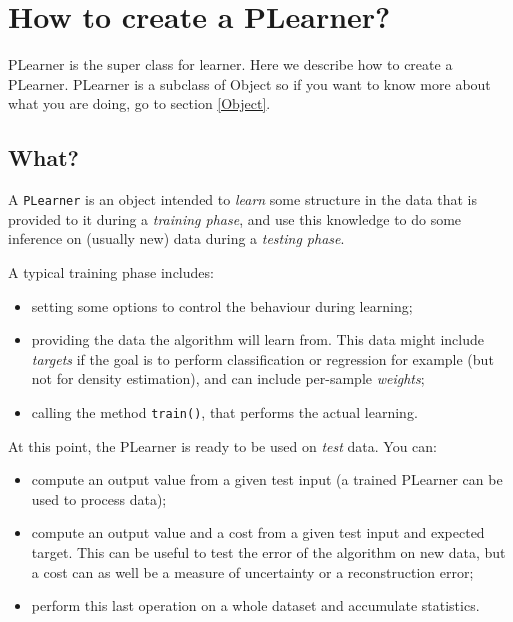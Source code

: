 \documentclass[11pt]{book}
\begin{document}
\section{How to create a PLearner?}

PLearner is the super class for learner. Here we describe how to create
a PLearner. PLearner is a subclass of Object so if you want to know more
about what you are doing, go to section \ref{Object}.

\subsection{What?}

A {\tt PLearner} is an object intended to {\em learn} some structure in
the data that is provided to it during a {\em training phase}, and use
this knowledge to do some inference on (usually new) data during a {\em
testing phase}.

A typical training phase includes:
\begin{itemize}
  \item setting some options to control the behaviour during learning;

  \item providing the data the algorithm will learn from. This data
  might include {\em targets} if the goal is to perform classification
  or regression for example (but not for density estimation), and can
  include per-sample {\em weights};

  \item calling the method {\tt train()}, that performs the actual learning.
\end{itemize}

At this point, the PLearner is ready to be used on {\em test} data. You can:
\begin{itemize}

  \item compute an output value from a given test input (a trained
  PLearner can be used to process data);

  \item compute an output value and a cost from a given test input and
  expected target. This can be useful to test the error of the algorithm
  on new data, but a cost can as well be a measure of uncertainty or a
  reconstruction error;

  \item perform this last operation on a whole dataset and accumulate
  statistics.

\end{itemize}
\end{document}
